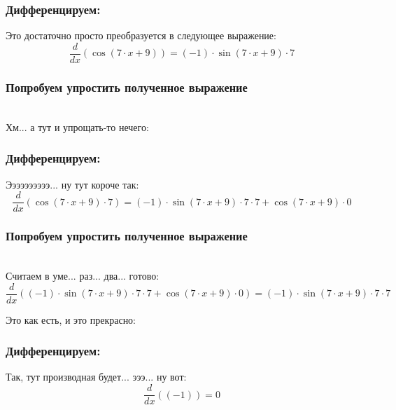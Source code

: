 \documentclass[a4paper,12pt]{article}
\begin{document}
\subsubsection*{Дифференцируем:}

Это достаточно просто преобразуется в следующее выражение:
\begin{dmath}\frac{d}{dx}\left(\operatorname{cos}\left(7\cdot x+ 9\right) \right)=(-1)\cdot \operatorname{sin}\left(7\cdot x+ 9\right) \cdot 7\end{dmath}
\subsubsection*{Попробуем упростить полученное выражение}
\\Хм... а тут и упрощать-то нечего:

\subsubsection*{Дифференцируем:}

Ээээээээээ... ну тут короче так:
\begin{dmath}\frac{d}{dx}\left(\operatorname{cos}\left(7\cdot x+ 9\right) \cdot 7\right)=(-1)\cdot \operatorname{sin}\left(7\cdot x+ 9\right) \cdot 7\cdot 7+ \operatorname{cos}\left(7\cdot x+ 9\right) \cdot 0\end{dmath}
\subsubsection*{Попробуем упростить полученное выражение}
\\Считаем в уме... раз... два... готово:\\
\begin{dmath}
	\frac{d}{dx}\left((-1)\cdot \operatorname{sin}\left(7\cdot x+ 9\right) \cdot 7\cdot 7+ \operatorname{cos}\left(7\cdot x+ 9\right) \cdot 0\right) = (-1)\cdot \operatorname{sin}\left(7\cdot x+ 9\right) \cdot 7\cdot 7\end{dmath}

Это как есть, и это прекрасно:

\subsubsection*{Дифференцируем:}

Так, тут производная будет... эээ... ну вот:
\begin{dmath}\frac{d}{dx}\left((-1)\right)=0\end{dmath}
\end{document}
